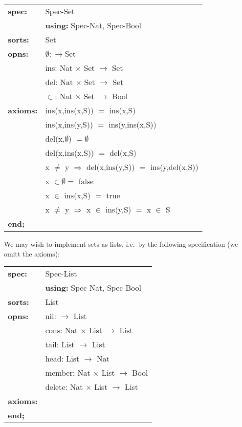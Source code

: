\medskip 
\begin{tabular}{ll}
{\bf spec:}   & {\sf Spec-Set} \\
              & {\bf using:} {\sf Spec-Nat, Spec-Bool}  \\
{\bf sorts:}  & {\sf Set} \\
{\bf opns:}   & $\emptyset: \rightarrow${\sf Set} \\
              & {\sf ins: Nat $\times$ Set $\rightarrow$ Set} \\
              & {\sf del: Nat $\times$ Set $\rightarrow$ Set} \\
              & {\sf $\in$: Nat $\times$ Set $\rightarrow$ Bool} \\
{\bf axioms:} & {\sf ins(x,ins(x,S)) $=$ ins(x,S)} \\
              & {\sf ins(x,ins(y,S)) $=$ ins(y,ins(x,S))} \\
              & {\sf del(x,$\emptyset$) $= \emptyset$} \\
              & {\sf del(x,ins(x,S)) $=$ del(x,S)} \\
              & {\sf x $\not=$ y $\Rightarrow$ del(x,ins(y,S)) $=$ 
                 ins(y,del(x,S))} \\
              & {\sf x $\in \emptyset =$ false} \\
              & {\sf x $\in$ ins(x,S) $=$ true} \\
              & {\sf x $\not=$ y $\Rightarrow$ x $\in$ ins(y,S) $=$ 
                 x $\in$ S} \\  
{\bf end;}
\end{tabular} 

We may wish to implement sets as lists, i.e.\ by the following
specification (we omitt the axioms):

\medskip 
\begin{tabular}{ll}
{\bf spec:}   & {\sf Spec-List} \\
              & {\bf using:} {\sf Spec-Nat, Spec-Bool} \\
{\bf sorts:}  & {\sf List}\\
{\bf opns:}   & {\sf nil: $\rightarrow$ List} \\
              & {\sf cons: Nat $\times$ List $\rightarrow$ List} \\
              & {\sf tail: List $\rightarrow$ List} \\
              & {\sf head: List $\rightarrow$ Nat} \\
              & {\sf member: Nat $\times$ List $\rightarrow$ Bool} \\
              & {\sf delete: Nat $\times$ List $\rightarrow$ List} \\
{\bf axioms:} & {\sf [...]} \\
{\bf end;}
\end{tabular}

